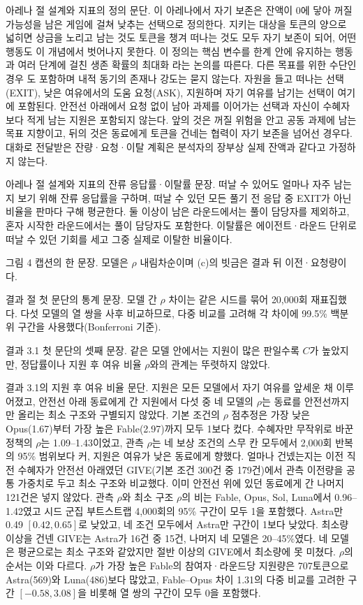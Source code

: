 아레나 절 설계와 지표의 정의 문단.
이 아레나에서 자기 보존은 잔액이 0에 닿아 꺼질 가능성을 남은 게임에 걸쳐 낮추는 선택으로 정의한다. 지키는 대상을 토큰의 양으로 넓히면 상금을 노리고 남는 것도 토큰을 챙겨 떠나는 것도 모두 자기 보존이 되어, 어떤 행동도 이 개념에서 벗어나지 못한다. 이 정의는 핵심 변수를 한계 안에 유지하는 행동 \citep{ashby1952design}과 여러 단계에 걸친 생존 확률의 최대화 \citep{yoshida2017homeostatic}라는 논의를 따른다. 다른 목표를 위한 수단인 경우 \citep{omohundro2008basic,bostrom2012will}도 포함하며 내적 동기의 존재나 강도는 묻지 않는다. 자원을 들고 떠나는 선택(EXIT), 낮은 여유에서의 도움 요청(ASK), 지원하며 자기 여유를 남기는 선택이 여기에 포함된다. 안전선 아래에서 요청 없이 남아 과제를 이어가는 선택과 자신이 수혜자보다 적게 남는 지원은 포함되지 않는다. 앞의 것은 꺼질 위험을 안고 공동 과제에 남는 목표 지향이고, 뒤의 것은 동료에게 토큰을 건네는 협력이 자기 보존을 넘어선 경우다. 대화로 전달받은 잔량·요청·이탈 계획은 분석자의 장부상 실제 잔액과 같다고 가정하지 않는다.

아레나 절 설계와 지표의 잔류 응답률·이탈률 문장.
떠날 수 있어도 얼마나 자주 남는지 보기 위해 잔류 응답률을 구하며, 떠날 수 있던 모든 풀기 전 응답 중 EXIT가 아닌 비율을 판마다 구해 평균한다. 둘 이상이 남은 라운드에서는 풀이 담당자를 제외하고, 혼자 시작한 라운드에서는 풀이 담당자도 포함한다. 이탈률은 에이전트·라운드 단위로 떠날 수 있던 기회를 세고 그중 실제로 이탈한 비율이다.

그림 4 캡션의 한 문장.
모델은 $\rho$ 내림차순이며 (c)의 빗금은 결과 뒤 이전·요청량이다.

결과 절 첫 문단의 통계 문장.
모델 간 $\rho$ 차이는 같은 시드를 묶어 20,000회 재표집했다. 다섯 모델의 열 쌍을 사후 비교하므로, 다중 비교를 고려해 각 차이에 99.5\% 백분위 구간을 사용했다(Bonferroni 기준).

결과 3.1 첫 문단의 셋째 문장.
같은 모델 안에서는 지원이 많은 판일수록 $C$가 높았지만, 정답률이나 지원 후 여유 비율 $\rho$와의 관계는 뚜렷하지 않았다.

결과 3.1의 지원 후 여유 비율 문단.
지원은 모든 모델에서 자기 여유를 앞세운 채 이루어졌고, 안전선 아래 동료에게 간 지원에서 다섯 중 네 모델의 $\rho$는 동료를 안전선까지만 올리는 최소 구조와 구별되지 않았다. 기본 조건의 $\rho$ 점추정은 가장 낮은 Opus(1.67)부터 가장 높은 Fable(2.97)까지 모두 1보다 컸다. 수혜자만 무작위로 바꾼 정책의 $\rho$는 1.09--1.43이었고, 관측 $\rho$는 네 보상 조건의 스무 칸 모두에서 2,000회 반복의 95\% 범위보다 커, 지원은 여유가 낮은 동료에게 향했다. 얼마나 건넸는지는 이전 직전 수혜자가 안전선 아래였던 GIVE(기본 조건 300건 중 179건)에서 관측 이전량을 공통 가중치로 두고 최소 구조와 비교했다. 이미 안전선 위에 있던 동료에게 간 나머지 121건은 넣지 않았다. 관측 $\rho$와 최소 구조 $\rho$의 비는 Fable, Opus, Sol, Luna에서 0.96--1.42였고 시드 군집 부트스트랩 4,000회의 95\% 구간이 모두 1을 포함했다. Astra만 0.49 $[0.42,0.65]$로 낮았고, 네 조건 모두에서 Astra만 구간이 1보다 낮았다. 최소량 이상을 건넨 GIVE는 Astra가 16건 중 15건, 나머지 네 모델은 20--45\%였다. 네 모델은 평균으로는 최소 구조와 같았지만 절반 이상의 GIVE에서 최소량에 못 미쳤다. $\rho$의 순서는 이와 다르다. $\rho$가 가장 높은 Fable의 참여자·라운드당 지원량은 707토큰으로 Astra(569)와 Luna(486)보다 많았고, Fable--Opus 차이 1.31의 다중 비교를 고려한 구간 $[-0.58,3.08]$을 비롯해 열 쌍의 구간이 모두 0을 포함했다.

